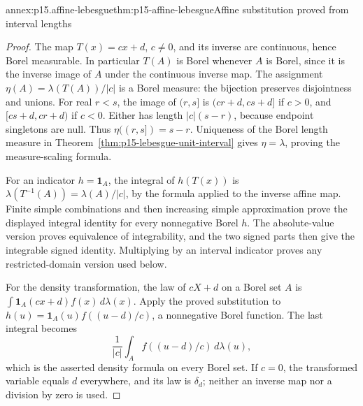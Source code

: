 \begin{annexitem}{annex:p15.affine-lebesgue}{thm:p15-affine-lebesgue}{Affine substitution proved from interval lengths}
\begin{proof}
The map \(T(x)=cx+d\), \(c\ne0\), and its inverse are
continuous, hence Borel measurable. In particular \(T(A)\)
is Borel whenever \(A\) is Borel, since it is the inverse
image of \(A\) under the continuous inverse map. The assignment
\(\eta(A)=\lambda(T(A))/|c|\) is a Borel measure: the
bijection preserves disjointness and unions. For real \(r<s\),
the image of \((r,s]\) is \((cr+d,cs+d]\) if \(c>0\),
and \([cs+d,cr+d)\) if \(c<0\). Either has length
\(|c|(s-r)\), because endpoint singletons are null.
Thus \(\eta((r,s])=s-r\). Uniqueness of the Borel length
measure in Theorem~\ref{thm:p15-lebesgue-unit-interval} gives
\(\eta=\lambda\), proving the measure-scaling formula.

For an indicator \(h=\mathbf1_A\), the integral of \(h(T(x))\)
is \(\lambda(T^{-1}(A))=\lambda(A)/|c|\), by the formula
applied to the inverse affine map. Finite simple combinations and
then increasing simple approximation prove the displayed integral
identity for every nonnegative Borel \(h\). The absolute-value
version proves equivalence of integrability, and the two signed
parts then give the integrable signed identity. Multiplying by
an interval indicator proves any restricted-domain version used below.

For the density transformation, the law of \(cX+d\) on a Borel
set \(A\) is
\(\int\mathbf1_A(cx+d)f(x)\,d\lambda(x)\).
Apply the proved substitution to
\(h(u)=\mathbf1_A(u)f((u-d)/c)\), a nonnegative Borel function.
The last integral becomes
\[
 \frac1{|c|}\int_A f((u-d)/c)\,d\lambda(u),
\]
which is the asserted density formula on every Borel set. If
\(c=0\), the transformed variable equals \(d\) everywhere,
and its law is \(\delta_d\); neither an inverse map nor a
division by zero is used.
\end{proof}
\end{annexitem}

